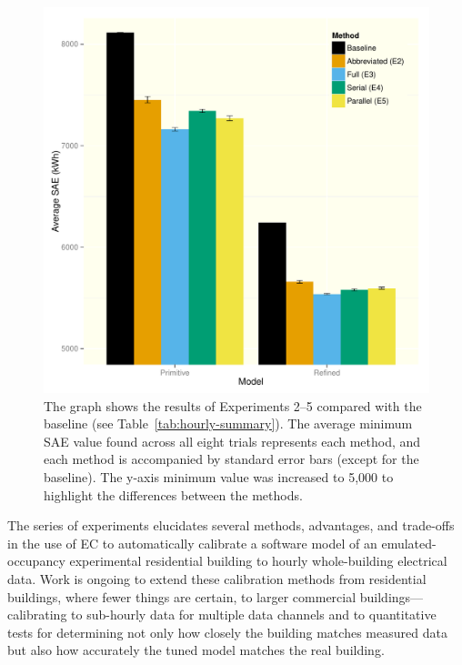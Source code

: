 \documentclass[preprint, review, 12pt]{elsarticle}
\begin{document}
\begin{figure}[htbp]
\centering
\includegraphics[width=5in]{graphics/figure3.pdf}
\caption{The graph shows the results of Experiments 2--5 compared with the baseline (see Table~\ref{tab:hourly-summary}). The average minimum SAE value found across all eight trials represents each method, and each method is accompanied by standard error bars (except for the baseline). The y-axis minimum value was increased to 5,000 to highlight the differences between the methods.}
\label{fig:hourly-summary}
\end{figure}

The series of experiments elucidates several methods, advantages, and trade-offs in the use of EC to automatically calibrate a software model of an emulated-occupancy experimental residential building to hourly whole-building electrical data. Work is ongoing to extend these calibration methods from %
residential buildings, where fewer things are certain, to larger commercial buildings---calibrating to sub-hourly data for multiple data channels and to quantitative tests for determining not only how closely the building matches measured data but also how accurately the tuned model matches the real building.
\end{document}
